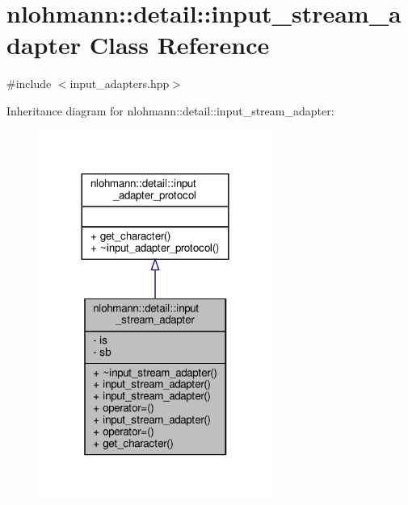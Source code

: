 \hypertarget{classnlohmann_1_1detail_1_1input__stream__adapter}{}\section{nlohmann\+:\+:detail\+:\+:input\+\_\+stream\+\_\+adapter Class Reference}
\label{classnlohmann_1_1detail_1_1input__stream__adapter}


{\ttfamily \#include $<$input\+\_\+adapters.\+hpp$>$}



Inheritance diagram for nlohmann\+:\+:detail\+:\+:input\+\_\+stream\+\_\+adapter\+:\nopagebreak
\begin{figure}[H]
\begin{center}
\leavevmode
\includegraphics[width=216pt]{classnlohmann_1_1detail_1_1input__stream__adapter__inherit__graph}
\end{center}
\end{figure}



